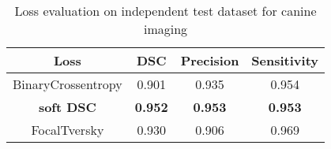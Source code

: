 \begin{table}[H]
\footnotesize
\caption{Loss evaluation on independent test dataset for canine imaging}
\centering
\begin{tabular}{c c c c}
\hline\hline
Loss & DSC & Precision & Sensitivity \\ [0.5ex]
\hline
BinaryCrossentropy & 0.901 & 0.935 & 0.954 \\
\textbf{soft DSC} & \textbf{0.952} & \textbf{0.953} & \textbf{0.953} \\
FocalTversky & 0.930 & 0.906 & 0.969 \\
\hline\hline
\end{tabular}
\label{table:loss_vet}
\end{table}

